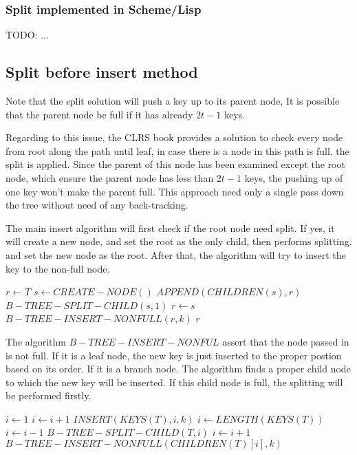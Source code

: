 \documentclass{article}
\begin{document}
\subsubsection*{Split implemented in Scheme/Lisp}
TODO: ...

\subsection{Split before insert method}
\label{split before insertion}

Note that the split solution will push a key up to its parent node,
It is possible that the parent node be full if it has already 
$2t-1$ keys.

Regarding to this issue, the CLRS book provides a solution to check 
every node from root along the path until leaf, in case there is a 
node in this path is full. the split is applied. Since the parent
of this node has been examined except the root node, which ensure
the parent node has less than $2t-1$ keys, the pushing up of one
key won't make the parent full. This approach need only a single
pass down the tree without need of any back-tracking.

The main insert algorithm will first check if the root node need
split. If yes, it will create a new node, and set the root as the 
only child, then performs splitting. and set the new node as the
root. After that, the algorithm will try to insert the key to the
non-full node.

\begin{algorithmic}[1]
  \State $r \leftarrow T$
    \State $s \leftarrow CREATE-NODE()$
    \State $APPEND(CHILDREN(s), r)$
    \State $B-TREE-SPLIT-CHILD(s, 1)$
    \State $r \leftarrow s$
  \EndIf
  \State $B-TREE-INSERT-NONFULL(r, k)$
  \State \Return $r$
\EndFunction
\end{algorithmic}

The algorithm $B-TREE-INSERT-NONFUL$ assert that the node passed in
is not full. If it is a leaf node, the new key is just inserted to 
the proper postion based on its order. If it is a branch node. The algorithm
finds a proper child node to which the new key will be inserted.
If this child node is full, the splitting will be performed firstly.

\begin{algorithmic}[1]
    \State $i \leftarrow 1$
      \State $i \leftarrow i+1$
    \EndWhile
    \State $INSERT(KEYS(T), i, k)$
  \Else
    \State $i \leftarrow LENGTH(KEYS(T))$
      \State $i \leftarrow i-1$
    \EndWhile
      \State $B-TREE-SPLIT-CHILD(T, i)$
        \State $i \leftarrow i+1$
      \EndIf
    \EndIf
    \State $B-TREE-INSERT-NONFULL(CHILDREN(T)[i], k)$
  \EndIf
\EndProcedure
\end{algorithmic}
\end{document}
